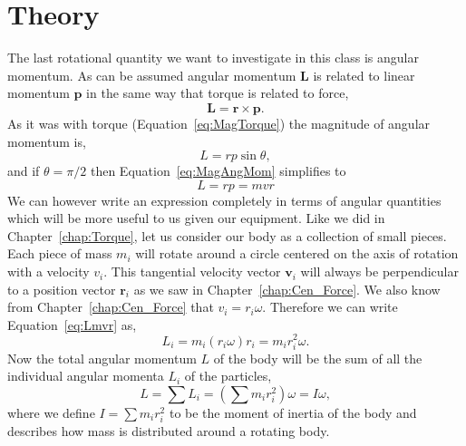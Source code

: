 \documentclass[main.tex]{subfiles}
\begin{document}
\section*{Theory}
The last rotational quantity we want to investigate in this class is angular momentum. As can be assumed angular momentum $\mathbf{L}$ is related to linear momentum $\mathbf{p}$ in the same way that torque is related to force,
\begin{equation} \label{eq:VectAngMom}
\mathbf{L}=\mathbf{r} \times \mathbf{p}.
\end{equation}
As it was with torque (Equation~\eqref{eq:MagTorque}) the magnitude of angular momentum is,
\begin{equation}\label{eq:MagAngMom}
L=rp\sin\theta,
\end{equation}
and if $\theta=\pi/2$ then Equation~\eqref{eq:MagAngMom} simplifies to 
\begin{equation} \label{eq:Lmvr}
L=rp=mvr
\end{equation}
We can however write an expression completely in terms of angular quantities which will be more useful to us given our equipment. Like we did in Chapter~\ref{chap:Torque}, let us consider our body as a collection of small pieces. Each piece of mass $m_i$ will rotate around a circle centered on the axis of rotation with a velocity $v_i.$ This tangential velocity vector $\mathbf{v}_i$ will always be perpendicular to a position vector $\mathbf{r}_i$ as we saw in Chapter~\ref{chap:Cen_Force}. We also know from Chapter~\ref{chap:Cen_Force} that $v_i=r_i\omega.$ Therefore we can write Equation~\eqref{eq:Lmvr} as,
\begin{equation}
L_i=m_i(r_i\omega)r_i=m_ir_i^2\omega.
\end{equation}
Now the total angular momentum $L$ of the body will be the sum of all the individual angular momenta $L_i$ of the particles,
\begin{equation}
L=\sum L_i=\left(\sum m_ir_i^2\right)\omega=I\omega,
\end{equation}
where we define $I=\sum m_ir_i^2$ to be the moment of inertia of the body and describes how mass is distributed around a rotating body. 
\end{document}
